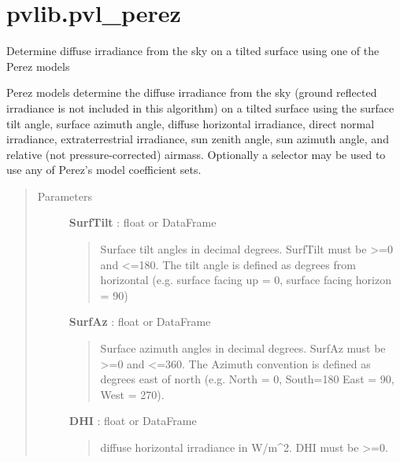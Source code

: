 \documentclass[letterpaper,10pt,english]{sphinxmanual}
\begin{document}
\section{pvlib.pvl\_perez}
\label{stubs/pvlib.pvl_perez:pvlib-pvl-perez}\label{stubs/pvlib.pvl_perez::doc}

\begin{fulllineitems}
\label{stubs/pvlib.pvl_perez:pvlib.pvl_perez}
Determine diffuse irradiance from the sky on a tilted surface using one of the Perez models

Perez models determine the diffuse irradiance from the sky (ground
reflected irradiance is not included in this algorithm) on a tilted
surface using the surface tilt angle, surface azimuth angle, diffuse
horizontal irradiance, direct normal irradiance, extraterrestrial
irradiance, sun zenith angle, sun azimuth angle, and relative (not
pressure-corrected) airmass. Optionally a selector may be used to use
any of Perez's model coefficient sets.
\begin{quote}\begin{description}
\item[{Parameters}] \leavevmode
\textbf{SurfTilt} : float or DataFrame
\begin{quote}

Surface tilt angles in decimal degrees.
SurfTilt must be \textgreater{}=0 and \textless{}=180. The tilt angle is defined as
degrees from horizontal (e.g. surface facing up = 0, surface facing
horizon = 90)
\end{quote}

\textbf{SurfAz} : float or DataFrame
\begin{quote}

Surface azimuth angles in decimal degrees.
SurfAz must be \textgreater{}=0 and \textless{}=360. The Azimuth convention is defined
as degrees east of north (e.g. North = 0, South=180 East = 90, West = 270).
\end{quote}

\textbf{DHI} : float or DataFrame
\begin{quote}

diffuse horizontal irradiance in W/m\textasciicircum{}2. 
DHI must be \textgreater{}=0.
\end{quote}


\end{description}
\end{quote}
\end{fulllineitems}
\end{document}

